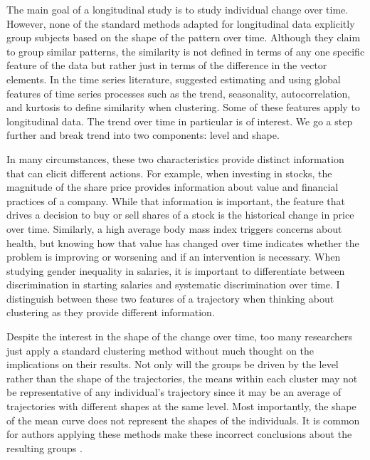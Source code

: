 The main goal of a longitudinal study is to study individual change over time. However, none of the standard methods adapted for longitudinal data explicitly group subjects based on the shape of the pattern over time. Although they claim to group similar patterns, the similarity is not defined in terms of any one specific feature of the data but rather just in terms of the difference in the vector elements. In the time series literature, \textcite{wang2006} suggested estimating and using global features of time series processes such as the trend, seasonality, autocorrelation, and kurtosis to define similarity when clustering. Some of these features apply to longitudinal data. The trend over time in particular is of interest. We go a step further and break trend into two components: level and shape. 

In many circumstances, these two characteristics provide distinct information that can elicit different actions. For example, when investing in stocks, the magnitude of the share price provides information about value and financial practices of a company. While that information is important, the feature that drives a decision to buy or sell shares of a stock is the historical change in price over time. Similarly, a high average body mass index triggers concerns about health, but knowing how that value has changed over time indicates whether the problem is improving or worsening and if an intervention is necessary. When studying gender inequality in salaries, it is important to differentiate between discrimination in starting salaries  and systematic discrimination over time. I distinguish between these two features of a trajectory when thinking about clustering as they provide different information.  

Despite the interest in the shape of the change over time, too many researchers just apply a standard clustering method without much thought on the implications on their results. Not only will the groups be driven by the level rather than the shape of the trajectories, the means within each cluster may not be representative of any individual's trajectory since it may be an average of trajectories with different shapes at the same level. Most importantly, the shape of the mean curve does not represent the shapes of the individuals. It is common for authors applying these methods make these incorrect conclusions about the resulting groups \cite{windle2004,mulvaney2006,broadbent2008,pryor2011,mccoy2010}. 

